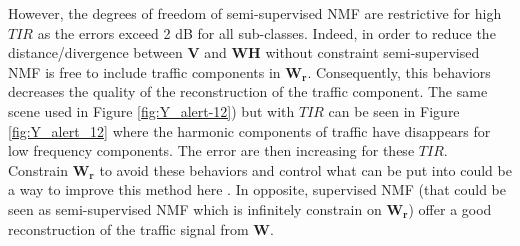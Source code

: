 \documentclass[twocolumn,a4paper,10pt]{article}
\begin{document}
However, the degrees of freedom of semi-supervised NMF are restrictive for high $TIR$ as the errors exceed 2 dB for all sub-classes. Indeed, in order to reduce the distance/divergence between $\mathbf{V}$ and $\mathbf{WH}$ without constraint semi-supervised NMF is free to include traffic components in $\mathbf{W_r}$. Consequently, this behaviors decreases the quality of the reconstruction of the traffic component. The same scene used in Figure \ref{fig:Y_alert-12}) but with $TIR$ can be seen in Figure \ref{fig:Y_alert_12} where the harmonic components of traffic have disappears for low frequency components. The error are then increasing for these $TIR$. Constrain $\mathbf{W_r}$ to avoid these behaviors and control what can be put into could be a way to improve this method here \cite{kitamura_music_2014}. In opposite, supervised NMF (that could be seen as semi-supervised NMF which is infinitely constrain on $\mathbf{W_r}$) offer a good reconstruction of the traffic signal from $\mathbf{W}$.\\
\end{document}
